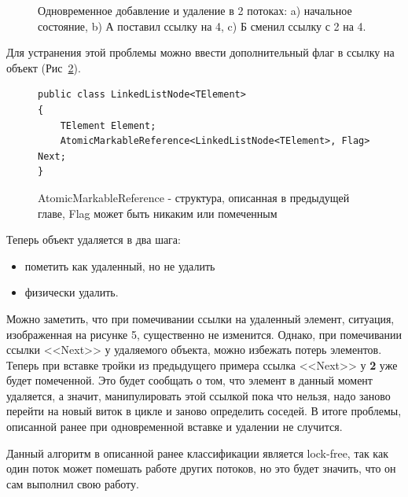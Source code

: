 \documentclass[12pt]{article}
\begin{document}
{\begin{figure}[h!]
\begin{minipage}[h]{0.45\linewidth}
{							\label{pic:insertDeleteC}
						}
					\end{minipage}
					\caption{Одновременное добавление и удаление в 2 потоках: a) начальное состояние, b) А поставил ссылку на 4, c) Б сменил ссылку с 2 на 4.}
				\end{figure}
				\par Для устранения этой проблемы можно ввести дополнительный флаг в ссылку на объект (Рис~\ref{pic:listAMR}).
				\begin{figure}[h]
					\begin{lstlisting}
public class LinkedListNode<TElement>
{
	TElement Element;
	AtomicMarkableReference<LinkedListNode<TElement>, Flag> Next;
}
					\end{lstlisting}
					\caption{AtomicMarkableReference - структура, описанная в предыдущей главе, Flag может быть никаким или помеченным}
					\label{pic:listAMR}
				\end{figure}
				\par Теперь объект удаляется в два шага: 
				\begin{itemize}
					\item пометить как удаленный, но не удалить
					\item физически удалить. 
				\end{itemize}
				Можно заметить, что при помечивании ссылки на удаленный элемент, ситуация, изображенная на рисунке 5, существенно не изменится. Однако, при помечивании ссылки <<Next>> у удаляемого объекта, можно избежать потерь элементов. Теперь при вставке тройки из предыдущего примера ссылка <<Next>> у \textbf{2} уже будет помеченной. Это будет сообщать о том, что элемент в данный момент удаляется, а значит, манипулировать этой ссылкой пока что нельзя, надо заново перейти на новый виток в цикле и заново определить соседей. В итоге проблемы, описанной ранее при одновременной вставке и удалении не случится.
				\par Данный алгоритм в описанной ранее классификации является lock-free, так как один поток может помешать работе других потоков, но это будет значить, что он сам выполнил свою работу.
}
\end{document}
